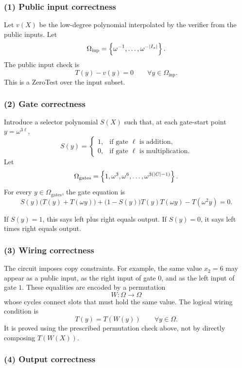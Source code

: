 \subsubsection*{(1) Public input correctness}

Let $v(X)$ be the low-degree polynomial interpolated by the verifier from the public inputs. Let
\[
    \Omega_{\mathrm{inp}}=\left\{\omega^{-1},\ldots,\omega^{-|I_x|}\right\}.
\]
The public input check is
\[
    T(y)-v(y)=0
    \qquad\forall y\in\Omega_{\mathrm{inp}}.
\]
This is a ZeroTest over the input subset.

\subsubsection*{(2) Gate correctness}

Introduce a selector polynomial $S(X)$ such that, at each gate-start point $y=\omega^{3\ell}$,
\[
S(y)=
\begin{cases}
1,&\text{if gate }\ell\text{ is addition},\\
0,&\text{if gate }\ell\text{ is multiplication}.
\end{cases}
\]
Let
\[
    \Omega_{\mathrm{gates}}=\left\{1,\omega^3,\omega^6,\ldots,\omega^{3(|C|-1)}\right\}.
\]
For every $y\in\Omega_{\mathrm{gates}}$, the gate equation is
\[
S(y)\bigl(T(y)+T(\omega y)\bigr)
+\bigl(1-S(y)\bigr)T(y)T(\omega y)
-T(\omega^2y)=0.
\]

If $S(y)=1$, this says left plus right equals output. If $S(y)=0$, it says left times right equals output.

\subsubsection*{(3) Wiring correctness}

The circuit imposes copy constraints. For example, the same value $x_2=6$ may appear as a public input, as the right input of gate $0$, and as the left input of gate $1$. These equalities are encoded by a permutation
\[
    W:\Omega\to\Omega
\]
whose cycles connect slots that must hold the same value. The logical wiring condition is
\[
    T(y)=T(W(y))
    \qquad\forall y\in\Omega.
\]
It is proved using the prescribed permutation check above, not by directly composing $T(W(X))$.

\subsubsection*{(4) Output correctness}

